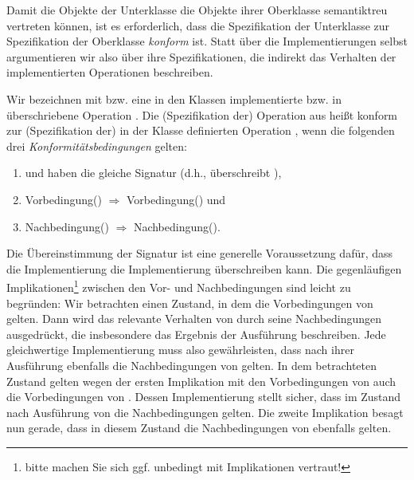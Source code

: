 Damit die Objekte der Unterklasse die Objekte ihrer Oberklasse semantiktreu vertreten können, ist es erforderlich, dass die Spezifikation der Unterklasse zur Spezi\-fika\-tion der Oberklasse \textit{konform} ist. Statt über die Implementierungen selbst argumentieren wir also über ihre Spezifikationen, die indirekt das Verhalten der implementierten Operationen beschreiben.

Wir bezeichnen mit  bzw.  eine in den Klassen  implementierte bzw. in  überschriebene Operation . Die (Spezifikation der) Operation  aus  heißt konform zur (Spezifikation der) in der Klasse  definierten Operation , wenn die folgenden drei \textit{Konformitätsbedingungen} gelten:

\begin{enumerate}
	\item {} und  
		haben die gleiche Signatur (d.h.,  überschreibt ),
	\item Vorbedingung() $\Rightarrow$ Vorbedingung() und
	\item Nachbedingung() $\Rightarrow$ Nachbedingung().
\end{enumerate}

Die Übereinstimmung der Signatur ist eine generelle Voraussetzung dafür, dass die Implementierung  die Implementierung  überschreiben kann. Die gegenläufigen Implikationen\footnote{bitte machen Sie sich ggf. unbedingt mit Implikationen vertraut!} zwischen den Vor- und Nachbedingungen sind leicht zu begründen: Wir betrachten einen Zustand, in dem die Vorbedingungen von  gelten. Dann wird das relevante Verhalten von  durch seine Nachbedingungen ausgedrückt, die insbesondere das Ergebnis der Ausführung beschreiben. Jede gleich\-wertige Implementierung muss also gewährleisten, dass nach ihrer Ausführung ebenfalls die Nachbedingungen von  gelten. In dem betrachteten Zustand gelten wegen der ersten Implikation mit den Vorbedingungen von  auch die Vorbedingungen von . Dessen Implementierung stellt sicher, dass im Zustand nach Ausführung von  die Nachbedingungen  gelten. Die zweite Implikation besagt nun gerade, dass in diesem Zustand die Nachbedingungen von  ebenfalls gelten. 


